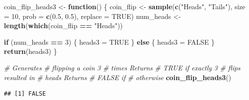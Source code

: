 \documentclass[
]{book}
\newenvironment{Shaded}{\begin{snugshade}}{\end{snugshade}}
\newcommand{\CommentTok}[1]{\textcolor[rgb]{0.56,0.35,0.01}{\textit{#1}}}
\newcommand{\ControlFlowTok}[1]{\textcolor[rgb]{0.13,0.29,0.53}{\textbf{#1}}}
\newcommand{\DataTypeTok}[1]{\textcolor[rgb]{0.13,0.29,0.53}{#1}}
\newcommand{\DecValTok}[1]{\textcolor[rgb]{0.00,0.00,0.81}{#1}}
\newcommand{\FloatTok}[1]{\textcolor[rgb]{0.00,0.00,0.81}{#1}}
\newcommand{\KeywordTok}[1]{\textcolor[rgb]{0.13,0.29,0.53}{\textbf{#1}}}
\newcommand{\NormalTok}[1]{#1}
\newcommand{\OperatorTok}[1]{\textcolor[rgb]{0.81,0.36,0.00}{\textbf{#1}}}
\newcommand{\OtherTok}[1]{\textcolor[rgb]{0.56,0.35,0.01}{#1}}
\newcommand{\StringTok}[1]{\textcolor[rgb]{0.31,0.60,0.02}{#1}}
\begin{document}
\begin{Shaded}
\begin{Highlighting}[]
\NormalTok{coin_flip_heads3 <-}\StringTok{ }\ControlFlowTok{function}\NormalTok{() \{}
\NormalTok{    coin_flip <-}\StringTok{ }\KeywordTok{sample}\NormalTok{(}\KeywordTok{c}\NormalTok{(}\StringTok{"Heads"}\NormalTok{,}
        \StringTok{"Tails"}\NormalTok{), }\DataTypeTok{size =} \DecValTok{10}\NormalTok{,}
        \DataTypeTok{prob =} \KeywordTok{c}\NormalTok{(}\FloatTok{0.5}\NormalTok{,}
            \FloatTok{0.5}\NormalTok{), }\DataTypeTok{replace =} \OtherTok{TRUE}\NormalTok{)}
\NormalTok{    num_heads <-}\StringTok{ }\KeywordTok{length}\NormalTok{(}\KeywordTok{which}\NormalTok{(coin_flip }\OperatorTok{==}
\StringTok{        "Heads"}\NormalTok{))}

    \ControlFlowTok{if}\NormalTok{ (num_heads }\OperatorTok{==}
\StringTok{        }\DecValTok{3}\NormalTok{) \{}
\NormalTok{        heads3 =}\StringTok{ }\OtherTok{TRUE}
\NormalTok{    \} }\ControlFlowTok{else}\NormalTok{ \{}
\NormalTok{        heads3 =}\StringTok{ }\OtherTok{FALSE}
\NormalTok{    \}}
    \KeywordTok{return}\NormalTok{(heads3)}
\NormalTok{\}}



\CommentTok{# Generates}
\CommentTok{# flipping a coin 3}
\CommentTok{# times Returns}
\CommentTok{# TRUE if exactly 3}
\CommentTok{# flips resulted in}
\CommentTok{# heads Returns}
\CommentTok{# FALSE if}
\CommentTok{# otherwise}
\KeywordTok{coin_flip_heads3}\NormalTok{()}
\end{Highlighting}
\end{Shaded}

\begin{verbatim}
## [1] FALSE
\end{verbatim}

\begin{Shaded}
\end{Shaded}
\end{document}
